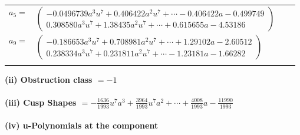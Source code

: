 \documentclass[1p]{elsarticle_modified}
\theoremstyle{definition}
\begin{document}
\begin{tabular}{m{7pt} m{180pt} m{7pt} m{180pt} }
\flushright $a_{5}=$&$\begin{pmatrix}-0.0496739 a^{3} u^{7}+0.406422 a^{2} u^{7}+\cdots-0.406422 a-0.499749\\0.308580 a^{3} u^{7}+1.38435 a^{2} u^{7}+\cdots+0.615655 a-4.53186\end{pmatrix}$ \\
\flushright $a_{9}=$&$\begin{pmatrix}-0.186653 a^{3} u^{7}+0.708981 a^{2} u^{7}+\cdots+1.29102 a-2.60512\\0.238334 a^{3} u^{7}+0.231811 a^{2} u^{7}+\cdots-1.23181 a-1.66282\end{pmatrix}$\\&\end{tabular}
\flushleft \textbf{(ii) Obstruction class $= -1$}\\~\\
\flushleft \textbf{(iii) Cusp Shapes $= -\frac{1636}{1993} u^7 a^3+\frac{3964}{1993} u^7 a^2+\cdots+\frac{4008}{1993} a-\frac{11990}{1993}$}\\~\\
\newpage\renewcommand{\arraystretch}{1}
\flushleft \textbf{(iv) u-Polynomials at the component}\newline \\
\end{document}
